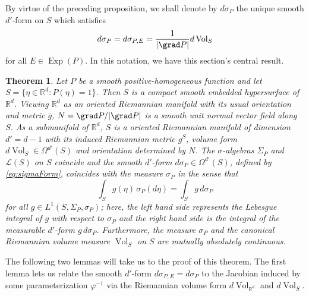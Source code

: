 \documentclass[11pt, letter]{book}
\newtheorem{theorem}{Theorem}[section]
\newcommand\Exp{\operatorname{Exp}}
\newcommand{\Vol}{\operatorname{Vol}}
\begin{document}
\noindent By virtue of the preceding proposition, we shall denote by $d\sigma_P$ the unique smooth $d'$-form on $S$ which satisfies
\begin{equation}\label{eq:sigmaForm}
    d\sigma_P=d\sigma_{P,E}=\frac{1}{|\grad P|}d\Vol_S
\end{equation}
for all $E\in\Exp(P)$. In this notation, we have this section's central result.



\begin{framed}
\begin{theorem}\label{thm:RiemannLebesgue}
Let $P$ be a smooth positive-homogeneous function and let $S=\{\eta\in\mathbb{R}^d:P(\eta)=1\}$. Then $S$ is a compact smooth embedded hypersurface of $\mathbb{R}^d$. Viewing $\mathbb{R}^d$ as an oriented Riemannian manifold with its usual orientation and metric $\overline{g}$, $N=\grad P/|\grad P|$ is a smooth unit normal vector field along $S$. As a submanifold of $\mathbb{R}^d$, $S$ is a oriented Riemannian manifold of dimension $d'=d-1$ with its induced Riemannian metric $g^S$, volume form $d\Vol_S\in\Omega^{d'}(S)$ and orientation determined by $N$. The $\sigma$-algebras $\Sigma_P$ and $\mathcal{L}(S)$ on $S$ coincide and the smooth $d'$-form $d\sigma_P\in\Omega^{d'}(S)$, defined by \eqref{eq:sigmaForm}, coincides with the measure $\sigma_P$ in the sense that
\begin{equation}\label{eq:FormsAndMeasures}
\int_S g(\eta)\,\sigma_P(d\eta)=\int_S g\,d\sigma_P
\end{equation}
for all $g\in L^1(S,\Sigma_P,\sigma_P)$; here, the left hand side represents the Lebesgue integral of $g$ with respect to $\sigma_P$ and the right hand side is the integral of the measurable $d'$-form $g\, d\sigma_P$. Furthermore, the measure $\sigma_P$ and the canonical Riemannian volume measure $\Vol_S$ on $S$ are mutually absolutely continuous.
\end{theorem} 
\end{framed}

\noindent The following two lemmas will take us to the proof of this theorem. The first lemma lets us relate the smooth $d'$-form $d\sigma_{P,E} = d\sigma_P$ to the Jacobian induced by some parameterization $\varphi^{-1}$ via the Riemannian volume form $d\Vol_{\mathbb{R}^d}$ and $d\Vol_S$.
\end{document}
